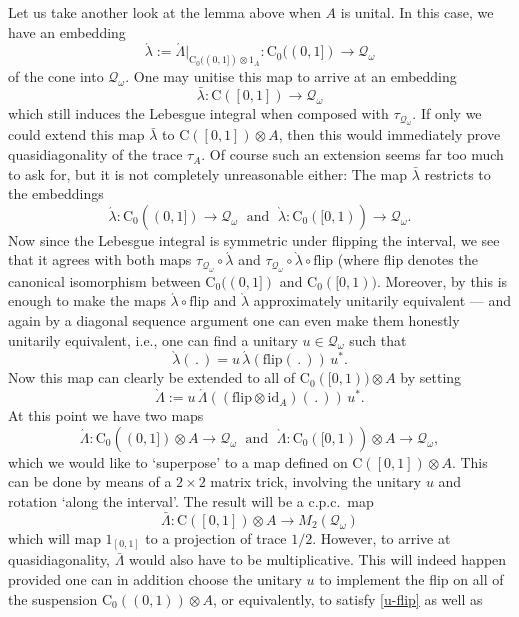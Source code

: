 \documentclass{amsart}
\newcounter{number}[section]
\newenvironment{nummer}{\refstepcounter{number}{\noindent\arabic{section}.\arabic{number}}}{}
\newcommand{\bn}{\noindent \begin{nummer} \rm}
\begin{document}
\bn
Let us take another look at the lemma above when $A$ is unital. In this case, we have an embedding 
\[
\acute{\lambda}:= \acute{\Lambda}|_{\mathrm{C}_0((0,1]) \otimes 1_A}: \mathrm{C}_0((0,1]) \longrightarrow \mathcal{Q}_\omega
\]
of the cone into  $\mathcal{Q}_\omega$. One may unitise this map to arrive at an embedding
\[
\bar{\lambda}: \mathrm{C}([0,1]) \longrightarrow \mathcal{Q}_\omega
\] 
which still induces the Lebesgue integral when composed with $\tau_{\mathcal{Q}_\omega}$. If only we could extend this map $\bar{\lambda}$ to $\mathrm{C}([0,1]) \otimes A$, then  this would immediately prove quasidiagonality of the trace $\tau_A$. Of course such an extension seems far too much to ask for, but it is not completely unreasonable either: The map $\bar{\lambda}$ restricts to the embeddings 
\[
\acute{\lambda}: \mathrm{C}_0((0,1]) \longrightarrow \mathcal{Q}_\omega \; \mbox{ and } \;\grave{\lambda}: \mathrm{C}_0([0,1)) \longrightarrow \mathcal{Q}_\omega.
 \]
 Now since the Lebesgue integral is symmetric under flipping the interval, we see that it agrees with both maps $\tau_{\mathcal{Q}_\omega} \circ \acute{\lambda}$ and $\tau_{\mathcal{Q}_\omega} \circ \grave{\lambda} \circ \mathrm{flip}$ (where flip denotes the canonical isomorphism between $\mathrm{C}_0((0,1])$ and $\mathrm{C}_0([0,1))$. Moreover, by \cite{CE:IMRN} this is enough to make the maps  $\acute{\lambda}\circ \mathrm{flip}$ and $\grave{\lambda}$ approximately unitarily equivalent --- and again by a diagonal sequence argument one can even make them honestly unitarily equivalent, i.e., one can find a unitary $u \in \mathcal{Q}_\omega$ such that
 \begin{equation}
 \label{u-flip}
 \grave{\lambda}  (\, .\,) = u\, \acute{\lambda}(\mathrm{flip}(\,.\,)) \,u^*.
 \end{equation}
Now this map can clearly be extended to all of $\mathrm{C}_0([0,1)) \otimes A$ by setting
\[
\grave{\Lambda}:= u\, \acute{\Lambda}((\mathrm{flip} \otimes \mathrm{id}_A)(\,.\,)) \,u^*.
\] 
At this point we have two maps 
\[
\acute{\Lambda}: \mathrm{C}_0((0,1]) \otimes A \longrightarrow \mathcal{Q}_\omega \; \mbox{ and } \;\grave{\Lambda}: \mathrm{C}_0([0,1)) \otimes A \longrightarrow \mathcal{Q}_\omega,
\]
which we would like to `superpose' to a map defined on  $\mathrm{C}([0,1]) \otimes A$. This can be done by means of a $2\times2$ matrix trick, involving the unitary $u$ and rotation `along the interval'. The result will be a c.p.c.\ map 
\[
\bar{\Lambda}: \mathrm{C}([0,1]) \otimes A \longrightarrow M_2(\mathcal{Q}_\omega)
\]
which will map $1_{[0,1]}$ to a projection of trace $1/2$. However, to arrive at quasidiagonality, $\bar{\Lambda}$ would also have to be multiplicative. This will indeed happen provided one can in addition choose the unitary $u$ to implement the flip on all of the suspension $\mathrm{C}_0((0,1)) \otimes A$, or equivalently, to satisfy \eqref{u-flip} as well as   
\end{document}
